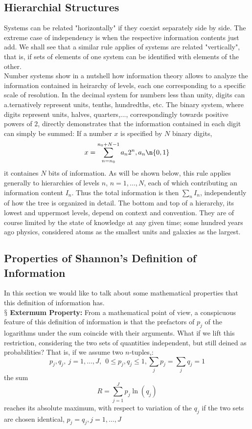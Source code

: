 \documentclass[9pt,a4paper, twocolumn]{article}
\newcounter{theo}
\newcommand{\newpoint}[1]{\ \\ \indent$\mathsection$ \textbf{#1}}
\begin{document}
        \subsection{Hierarchial Structures}
            Systems can be related "horizontally" if they coexist separately side by side. The extreme case of independency is when the respective information contents just add. We shall see that a similar rule applies of systems are related  "vertically", that is, if sets of elements of one system can be identified with elements of the other. 
            \\
            Number systems show in a nutshell how information theory allows to analyze the information contained in heirarchy of levels, each one corresponding to a specific scale of resolution. In the decimal system for numbers less than unity, digits can a.ternatively represent units, tenths, hundredths, etc. The binary system, where digits represent units, halves, quarters,..., correspondingly towards positive powers of $2$, directly demonstrates that the information contained in each digit can simply be summed: If a number $x$ is specified by $N$ binary digits,
            \begin{equation}
                x = \sum_{n=n_0}^{n_0 + N-1} a_n2^n, a_n \n\{0,1\}
            \end{equation}
            it containes $N$ bits of information. As will be shown below, this rule applies generally to hierarchies of levels $n$, $n=1,\dots, N$, each of which contributing an information content $I_n$. Thus the total information is then $\sum_n I_n$, independently of how the tree is organized in detail. The bottom and top of a hierarchy, its lowest and uppermost levels, depend on context and convention. They are of course limited by the state of knowledge at any given time; some hundred years ago physics, considered atoms as the smallest units and galaxies as the largest.
        \subsection{Properties of Shannon's Definition of Information}
            In this section we would like to talk about some mathematical properties that this definition of information has. 
            \newpoint{Extermum Property:} From a mathematical point of view, a conspicuous feature of this definition of information is that the prefactors of $p_j$ of the logarithms under the sum coincide with their arguments. What if we lift this restriction, considering the two sets of quantities independent, but still deined as probabilities? That is, if we assume two $n$-tuples,:
            \begin{equation}
                p_j,q_j,  \ j = 1,\dots,J, \ \ 0\leq p_j,q_j\leq 1, \sum_j p_j = \sum_j q_j = 1
            \end{equation}
            the sum 
            \begin{equation}
                R = \sum_{j=1}^J p_j\ln(q_j)
            \end{equation}
            reaches its absolute maximum, with respect to variation of the $q_j$ if the two sets are chosen identical, $p_j = q_j, j = 1,\dots,J$

            
        
\end{document}
